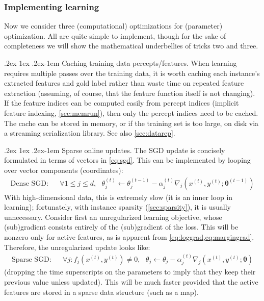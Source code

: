\documentclass[11pt,letterpaper]{article}
\makeatletter
\renewcommand{\paragraph}{%
  \@startsection{paragraph}{4}%
  {\z@}{.2ex \@plus 1ex \@minus .2ex}{-1em}%
  {\normalfont\normalsize\bfseries}%
}
\makeatother
\begin{document}
\subsubsection{Implementing learning}\label{sec:impllearning}

Now we consider three (computational) optimizations for (parameter) optimization.
All are quite simple to implement, though for the sake of completeness we will 
show the mathematical underbellies of tricks two and three.

\paragraph{Caching training data percepts/features.}\label{sec:caching}
When learning requires multiple passes over the training data,
it is worth caching each instance's extracted features and gold label rather than 
waste time on repeated feature extraction (assuming, of course, that the feature function itself is not changing).
If the feature indices can be computed easily from percept indices (implicit feature indexing, \cref{sec:memrun}), 
then only the percept indices need to be cached.
The cache can be stored in memory, or if the training set is too large, on disk via a streaming serialization library.
See also \cref{sec:datarep}.

\paragraph{Sparse online updates.}
The SGD update is concisely formulated in terms of vectors in \cref{eq:sgd}.
This can be implemented by looping over vector components (coordinates):
\begin{align}\label{eq:densesgd}
\textrm{Dense SGD:} & & \forall 1\leq j\leq d,~~~ \theta^{(t)}_j \leftarrow \theta^{(t-1)}_j - \alpha^{(t)}_j \nabla_j(x^{(t)},y^{(t)};\boldsymbol{\theta}^{(t-1)})
\end{align}
With high-dimensional data, this is extremely slow (it is an inner loop in learning); 
fortunately, with instance sparsity (\cref{sec:sparsity}), it is usually unnecessary.
Consider first an unregularized learning objective, whose (sub)gradient consists entirely of 
the (sub)gradient of the loss. This will be nonzero only for active features, as is apparent from \cref{eq:loggrad,eq:margingrad}.
Therefore, the unregularized update looks like:
\begin{align}\label{eq:sparsesgd}
\textrm{Sparse SGD:} & & \forall j: f_j(x^{(t)},y^{(t)})\neq 0,~~~ \theta_j \leftarrow \theta_j - \alpha^{(t)}_j \nabla_j(x^{(t)},y^{(t)};\boldsymbol{\theta})
\end{align}
(dropping the time superscripts on the parameters to imply that they keep their previous value unless updated).
This will be much faster provided that the active features are stored in a sparse data structure (such as a map).
\end{document}

